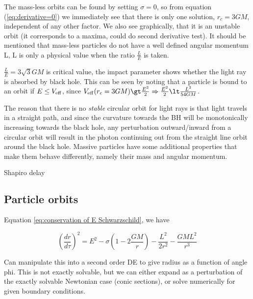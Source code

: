 The mass-less orbits can be found by setting $\sigma=0$, so from equation (\ref{eq:derivative=0}) we immediately see that there is only one solution, $r_c=3GM$, independent of any other factor. We also see graphically, that it is an unstable orbit (it corresponds to a maxima, could do second derivative test). It should be mentioned that mass-less particles do not have a well defined angular momentum L, L is only a physical value when the ratio $\frac{L}{E}$ is taken. 

$\frac{L}{E} = 3\sqrt{3}GM$ is critical value, the impact parameter shows whether the light ray is absorbed by black hole. This can be seen by noting that a particle is bound to an orbit if $E \leq V_{\rm{eff}}$, since $V_{\rm{eff}}(r_c=3GM) \gt \frac{E^2}{2} \Rightarrow \frac{E^2}{2} \lt \frac{L^2}{54GM}$.

The reason that there is no \textit{stable} circular orbit for light rays is that light travels in a straight path, and since the curvature towards the BH will be monotonically increasing towards the black hole, any perturbation outward/inward from a circular orbit will result in the photon continuing out from the straight line orbit around the black hole. Massive particles have some additional properties that make them behave differently, namely their mass and angular momentum. 


Shapiro delay

\subsection{Particle orbits}

Equation \ref{eq:conservation of E Schwarzschild}, we have

\begin{equation}
    \left (\frac{dr}{d\tau} \right )^2 = E^2 - \sigma \left( 1 - 2 \frac{G M}{r} \right) - \frac{L^2}{2 r^2} - \frac{G M L^2}{r^3}
\end{equation}

Can manipulate this into a second order DE to give radius as a function of angle phi. This is not exactly solvable, but we can either expand as a perturbation of the exactly solvable Newtonian case (conic sections), or solve numerically for given boundary conditions.

